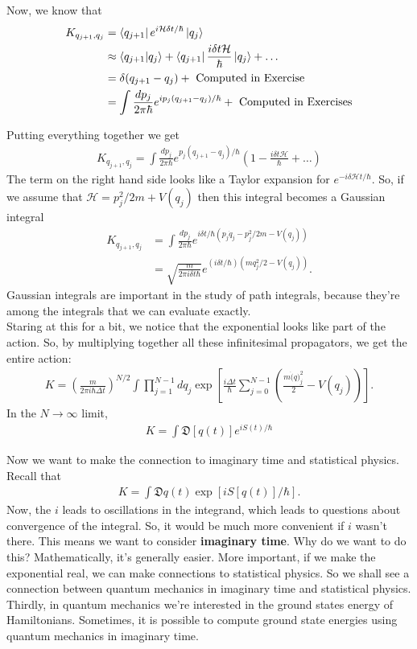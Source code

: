 \documentclass{book}
\theoremstyle{definition}
\newcommand{\nn}{\nonumber}
\newcommand{\had}{\mathcal{H}}
\newcommand{\f}[2]{\frac{#1}{#2}}
\newcommand{\lp}{\left(}
\newcommand{\rp}{\right)}
\newcommand{\lb}{\left[}
\newcommand{\rb}{\right]}
\begin{document}
Now, we know that
\begin{align}
K_{q_{j+1},q_j} &= \bra{q_{j+1}}  e^{i\had \delta t/\hbar}  \ket{q_j}\nn\\
&\approx \braket{q_{j+1}}{q_j}   +  \bra{q_{j+1}}  \f{i\delta t \had}{\hbar} \ket{q_j} + \dots\nn\\
&= \delta(q_{j+1} - q_j) + \text{ Computed in Exercise } \nn\\
&= \int \f{dp_j}{2\pi \hbar} e^{ip_j(q_{j+1} - q_j)/\hbar} +  \text{ Computed in Exercises}
\end{align}

Putting everything together we get
\begin{align}
K_{q_{j+1},q_j} = \int \f{dp_j}{2\pi \hbar} e^{p_j(q_{j+1} - q_j)/\hbar}\lp 1 - \f{i\delta t \had}{\hbar} + \dots \rp
\end{align}
The term on the right hand side looks like a Taylor expansion for $e^{-i\delta \had t /\hbar}$. So, if we assume that $\had =  p_j^2 / 2m + V(q_j)$ then this integral becomes a Gaussian integral
\begin{align}
K_{q_{j+1},q_j} &= \int \f{dp_j}{2\pi \hbar} e^{i\delta t/\hbar (p_j\dot{q}_j  - p_j^2/2m - V(q_j) )  } \nn\\
&= \sqrt{\f{m}{2\pi i \delta t \hbar}} e^{(i\delta t /\hbar) ( mq_j^2/2 - V(q_j) )}.
\end{align}
Gaussian integrals are important in the study of path integrals, because they're among the integrals that we can evaluate exactly. \\

Staring at this for a bit, we notice that the exponential looks like part of the action. So, by multiplying together all these infinitesimal propagators, we get the entire action:
\begin{align}
K = \lp \f{m}{2\pi i \hbar \Delta t} \rp^{N/2} \int \prod^{N-1}_{j=1} dq_j \exp\lb \f{i \Delta t}{\hbar} \sum^{N-1}_{j=0} \lp \f{m\dot(q)_j^2}{2} - V(q_j) \rp \rb.
\end{align}
In the $N\to \infty$ limit, 
\begin{align}
K = \int \mathfrak{D}[q(t)] e^{iS(t)/\hbar}
\end{align}



Now we want to make the connection to imaginary time and statistical physics. Recall that
\begin{align}
K = \int \mathfrak{D}q(t) \exp\lb iS[q(t)]/\hbar \rb.
\end{align}
Now, the $i$ leads to oscillations in the integrand, which leads to questions about convergence of the integral. So, it would be much more convenient if $i$ wasn't there. This means we want to consider \textbf{imaginary time}. Why do we want to do this? Mathematically, it's generally easier. More important, if we make the exponential real, we can make connections to statistical physics. So we shall see a connection between quantum mechanics in imaginary time and statistical physics. Thirdly, in quantum mechanics we're interested in the ground states energy of Hamiltonians. Sometimes, it is possible to compute ground state energies using quantum mechanics in imaginary time. \\
\end{document}
